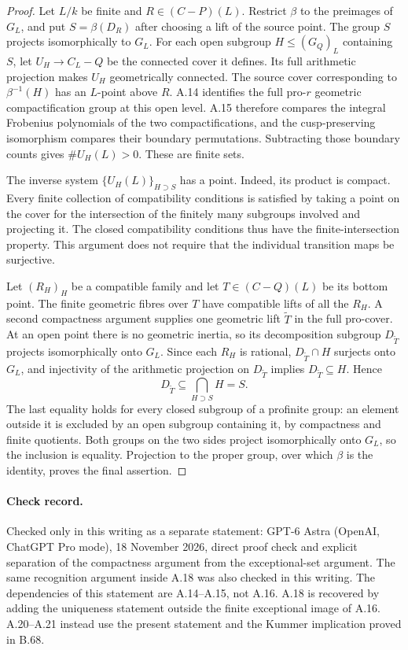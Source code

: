 \begin{proof}
Let $L/k$ be finite and $R\in(C-P)(L)$. Restrict $\beta$ to the
preimages of $G_L$, and put $S=\beta(D_R)$ after choosing a lift
of the source point. The group $S$ projects isomorphically to
$G_L$. For each open subgroup $H\le(G_Q)_L$ containing $S$,
let $U_H\to C_L-Q$ be the connected cover it defines.
Its full arithmetic projection makes $U_H$ geometrically connected.
The source cover corresponding to $\beta^{-1}(H)$ has an
$L$-point above $R$. A.14 identifies the full pro-$r$ geometric
compactification group at this open level. A.15 therefore compares
the integral Frobenius polynomials of the two compactifications,
and the cusp-preserving isomorphism compares their boundary
permutations. Subtracting those boundary counts gives
$\#U_H(L)>0$. These are finite sets.

The inverse system $\{U_H(L)\}_{H\supset S}$ has a point.
Indeed, its product is compact. Every finite collection of
compatibility conditions is satisfied by taking a point on
the cover for the intersection of the finitely many subgroups
involved and projecting it. The closed compatibility conditions
thus have the finite-intersection property. This argument does
not require that the individual transition maps be surjective.

Let $(R_H)_H$ be a compatible family and let
$T\in(C-Q)(L)$ be its bottom point. The finite geometric fibres
over $T$ have compatible lifts of all the $R_H$. A second
compactness argument supplies one geometric lift $\widetilde T$
in the full pro-cover. At an open point there is no geometric
inertia, so its decomposition subgroup $D_{\widetilde T}$
projects isomorphically onto $G_L$. Since each $R_H$ is rational,
$D_{\widetilde T}\cap H$ surjects onto $G_L$, and injectivity
of the arithmetic projection on $D_{\widetilde T}$ implies
$D_{\widetilde T}\subseteq H$. Hence
\[
 D_{\widetilde T}\subseteq\bigcap_{H\supset S}H=S.
\]
The last equality holds for every closed subgroup of a profinite
group: an element outside it is excluded by an open subgroup
containing it, by compactness and finite quotients. Both groups
on the two sides project isomorphically onto $G_L$, so the
inclusion is equality. Projection to the proper group, over
which $\beta$ is the identity, proves the final assertion.
\end{proof}

\paragraph{Check record.}
Checked only in this writing as a separate statement: GPT-6 Astra
(OpenAI, ChatGPT Pro mode), 18 November 2026, direct proof check
and explicit separation of the compactness argument from the
exceptional-set argument. The same recognition argument inside
A.18 was also checked in this writing. The dependencies of this
statement are A.14--A.15, not A.16. A.18 is recovered by adding
the uniqueness statement outside the finite exceptional image
of A.16. A.20--A.21 instead use the present statement and the
Kummer implication proved in B.68.
